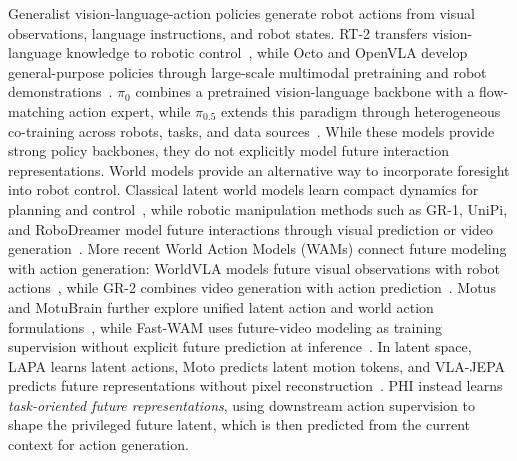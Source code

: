 \documentclass{article} %
\begin{document}
Generalist vision-language-action policies generate robot actions from visual observations, language instructions, and robot states. RT-2 transfers vision-language knowledge to robotic control~\cite{brohan2023rt2}, while Octo and OpenVLA develop general-purpose policies through large-scale multimodal pretraining and robot demonstrations~\cite{octo2024,kim2024openvla}. $\pi_0$ combines a pretrained vision-language backbone with a flow-matching action expert, while $\pi_{0.5}$ extends this paradigm through heterogeneous co-training across robots, tasks, and data sources~\cite{black2024pi0,black2025pi05}. While these models provide strong policy backbones, they do not explicitly model future interaction representations. World models provide an alternative way to incorporate foresight into robot control. Classical latent world models learn compact dynamics for planning and control~\cite{hafner2019planet,hafner2023dreamerv3,hansen2024tdmpc2}, while robotic manipulation methods such as GR-1, UniPi, and RoboDreamer model future interactions through visual prediction or video generation~\cite{wu2023gr1,du2023unipi,zhou2024robodreamer}. More recent World Action Models (WAMs) connect future modeling with action generation: WorldVLA models future visual observations with robot actions~\cite{cen2025worldvla}, while GR-2 combines video generation with action prediction~\cite{cheang2024gr2}. Motus and MotuBrain further explore unified latent action and world action formulations~\cite{bi2025motusunifiedlatentaction,motubrainteam2026motubrainadvancedworldaction}, while Fast-WAM uses future-video modeling as training supervision without explicit future prediction at inference~\cite{yuan2026fastwamworldactionmodels}. In latent space, LAPA learns latent actions, Moto predicts latent motion tokens, and VLA-JEPA predicts future representations without pixel reconstruction~\cite{ye2024lapa,chen2024moto,sun2026vlajepa}. PHI instead learns \emph{task-oriented future representations}, using downstream action supervision to shape the privileged future latent, which is then predicted from the current context for action generation.
\end{document}
